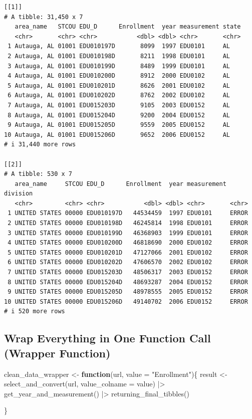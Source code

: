 \documentclass[
  letterpaper,
  DIV=11,
  numbers=noendperiod]{scrartcl}
\newenvironment{Shaded}{\begin{snugshade}}{\end{snugshade}}
\newcommand{\AttributeTok}[1]{\textcolor[rgb]{0.40,0.45,0.13}{#1}}
\newcommand{\ControlFlowTok}[1]{\textcolor[rgb]{0.00,0.23,0.31}{\textbf{#1}}}
\newcommand{\FunctionTok}[1]{\textcolor[rgb]{0.28,0.35,0.67}{#1}}
\newcommand{\NormalTok}[1]{\textcolor[rgb]{0.00,0.23,0.31}{#1}}
\newcommand{\OtherTok}[1]{\textcolor[rgb]{0.00,0.23,0.31}{#1}}
\newcommand{\SpecialCharTok}[1]{\textcolor[rgb]{0.37,0.37,0.37}{#1}}
\newcommand{\StringTok}[1]{\textcolor[rgb]{0.13,0.47,0.30}{#1}}
\begin{document}
\begin{verbatim}
[[1]]
# A tibble: 31,450 x 7
   area_name   STCOU EDU_D      Enrollment  year measurement state
   <chr>       <chr> <chr>           <dbl> <dbl> <chr>       <chr>
 1 Autauga, AL 01001 EDU010197D       8099  1997 EDU0101     AL   
 2 Autauga, AL 01001 EDU010198D       8211  1998 EDU0101     AL   
 3 Autauga, AL 01001 EDU010199D       8489  1999 EDU0101     AL   
 4 Autauga, AL 01001 EDU010200D       8912  2000 EDU0102     AL   
 5 Autauga, AL 01001 EDU010201D       8626  2001 EDU0102     AL   
 6 Autauga, AL 01001 EDU010202D       8762  2002 EDU0102     AL   
 7 Autauga, AL 01001 EDU015203D       9105  2003 EDU0152     AL   
 8 Autauga, AL 01001 EDU015204D       9200  2004 EDU0152     AL   
 9 Autauga, AL 01001 EDU015205D       9559  2005 EDU0152     AL   
10 Autauga, AL 01001 EDU015206D       9652  2006 EDU0152     AL   
# i 31,440 more rows

[[2]]
# A tibble: 530 x 7
   area_name     STCOU EDU_D      Enrollment  year measurement division
   <chr>         <chr> <chr>           <dbl> <dbl> <chr>       <chr>   
 1 UNITED STATES 00000 EDU010197D   44534459  1997 EDU0101     ERROR   
 2 UNITED STATES 00000 EDU010198D   46245814  1998 EDU0101     ERROR   
 3 UNITED STATES 00000 EDU010199D   46368903  1999 EDU0101     ERROR   
 4 UNITED STATES 00000 EDU010200D   46818690  2000 EDU0102     ERROR   
 5 UNITED STATES 00000 EDU010201D   47127066  2001 EDU0102     ERROR   
 6 UNITED STATES 00000 EDU010202D   47606570  2002 EDU0102     ERROR   
 7 UNITED STATES 00000 EDU015203D   48506317  2003 EDU0152     ERROR   
 8 UNITED STATES 00000 EDU015204D   48693287  2004 EDU0152     ERROR   
 9 UNITED STATES 00000 EDU015205D   48978555  2005 EDU0152     ERROR   
10 UNITED STATES 00000 EDU015206D   49140702  2006 EDU0152     ERROR   
# i 520 more rows
\end{verbatim}

\subsection{Wrap Everything in One Function Call (Wrapper
Function)}\label{wrap-everything-in-one-function-call-wrapper-function}

\begin{Shaded}
\begin{Highlighting}[]
\NormalTok{clean\_data\_wrapper }\OtherTok{\textless{}{-}} \ControlFlowTok{function}\NormalTok{(url, }\AttributeTok{value =} \StringTok{"Enrollment"}\NormalTok{)\{}
\NormalTok{  result }\OtherTok{\textless{}{-}} \FunctionTok{select\_and\_convert}\NormalTok{(url, }\AttributeTok{value\_colname =}\NormalTok{ value) }\SpecialCharTok{|\textgreater{}}
    \FunctionTok{get\_year\_and\_measurement}\NormalTok{() }\SpecialCharTok{|\textgreater{}} 
    \FunctionTok{returning\_final\_tibbles}\NormalTok{() }
    
\NormalTok{\}}
\end{Highlighting}
\end{Shaded}
\end{document}
